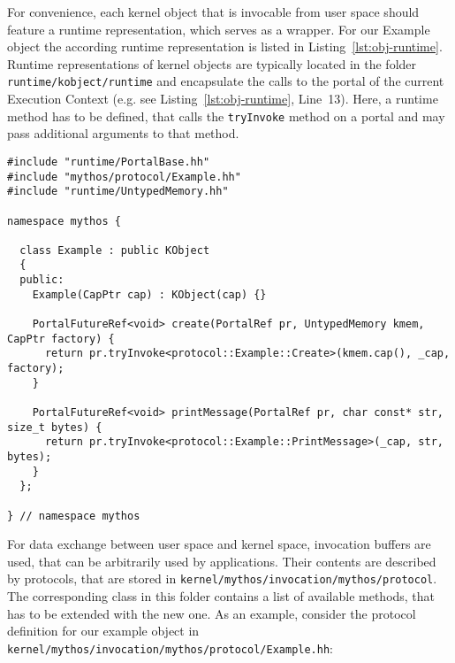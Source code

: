 For convenience, each kernel object that is invocable from user space should
feature a runtime representation, which serves as a wrapper.  For our Example
object the according runtime representation is listed in
Listing~\ref{lst:obj-runtime}. Runtime representations of kernel objects are
typically located in the folder \texttt{runtime/kobject/runtime} and
encapsulate the calls to the portal of the current Execution Context (e.g. see
Listing~\ref{lst:obj-runtime}, Line~13). Here, a runtime method has to be
defined, that calls the \texttt{tryInvoke} method on a portal and may pass
additional arguments to that method.

\lstset{language=c++,caption=Object's Runtime Representation,label=lst:obj-runtime}
\begin{lstlisting}
#include "runtime/PortalBase.hh"
#include "mythos/protocol/Example.hh"
#include "runtime/UntypedMemory.hh"

namespace mythos {

  class Example : public KObject
  {
  public:
    Example(CapPtr cap) : KObject(cap) {}

    PortalFutureRef<void> create(PortalRef pr, UntypedMemory kmem, CapPtr factory) {
      return pr.tryInvoke<protocol::Example::Create>(kmem.cap(), _cap, factory);
    }

    PortalFutureRef<void> printMessage(PortalRef pr, char const* str, size_t bytes) {
      return pr.tryInvoke<protocol::Example::PrintMessage>(_cap, str, bytes);
    }
  };

} // namespace mythos
\end{lstlisting}

For data exchange between user space and kernel space, invocation buffers are
used, that can be arbitrarily used by applications. Their contents are
described by protocols, that are stored in
\texttt{kernel/mythos/invocation/mythos/protocol}. The corresponding class in
this folder contains a list of available methods, that has to be extended with
the new one. As an example, consider the protocol definition for our example object in
\texttt{kernel/mythos/invocation/mythos/protocol/Example.hh}:

